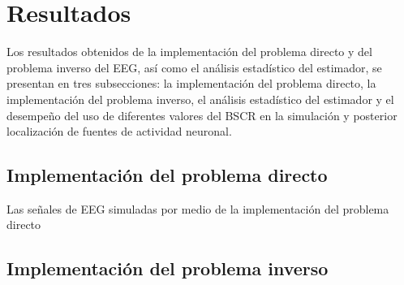 %
\chapter{Resultados}
\label{sec:results}

Los resultados obtenidos de la implementación del problema directo y del problema inverso del EEG, así como el análisis estadístico del estimador, se presentan en tres subsecciones: la implementación del problema directo, la implementación del problema inverso, el análisis estadístico del estimador y el desempeño del uso de diferentes valores del BSCR en la simulación y posterior localización de fuentes de actividad neuronal.

\section{Implementación del problema directo}
\label{sec:results:direct}

Las señales de EEG simuladas por medio de la implementación del problema directo 

\section{Implementación del problema inverso}
\label{sec:results:inverse}
